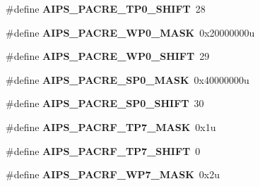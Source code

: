 \begin{DoxyCompactItemize}
\item 
\#define {\bfseries A\+I\+P\+S\+\_\+\+P\+A\+C\+R\+E\+\_\+\+T\+P0\+\_\+\+S\+H\+I\+FT}~28\hypertarget{group__AIPS__Register__Masks_ga33e43ff102c16587af4a1b319ba31787}{}\label{group__AIPS__Register__Masks_ga33e43ff102c16587af4a1b319ba31787}

\item 
\#define {\bfseries A\+I\+P\+S\+\_\+\+P\+A\+C\+R\+E\+\_\+\+W\+P0\+\_\+\+M\+A\+SK}~0x20000000u\hypertarget{group__AIPS__Register__Masks_ga748d7f597abbdc063d8d089bfac5264b}{}\label{group__AIPS__Register__Masks_ga748d7f597abbdc063d8d089bfac5264b}

\item 
\#define {\bfseries A\+I\+P\+S\+\_\+\+P\+A\+C\+R\+E\+\_\+\+W\+P0\+\_\+\+S\+H\+I\+FT}~29\hypertarget{group__AIPS__Register__Masks_gadbb6183241cf5602dd8e8cd87f5e970d}{}\label{group__AIPS__Register__Masks_gadbb6183241cf5602dd8e8cd87f5e970d}

\item 
\#define {\bfseries A\+I\+P\+S\+\_\+\+P\+A\+C\+R\+E\+\_\+\+S\+P0\+\_\+\+M\+A\+SK}~0x40000000u\hypertarget{group__AIPS__Register__Masks_gad466232930d5e4ed228f96fc26ead8c2}{}\label{group__AIPS__Register__Masks_gad466232930d5e4ed228f96fc26ead8c2}

\item 
\#define {\bfseries A\+I\+P\+S\+\_\+\+P\+A\+C\+R\+E\+\_\+\+S\+P0\+\_\+\+S\+H\+I\+FT}~30\hypertarget{group__AIPS__Register__Masks_ga47620f45a33c83729ba42d5cb7a96cd3}{}\label{group__AIPS__Register__Masks_ga47620f45a33c83729ba42d5cb7a96cd3}

\item 
\#define {\bfseries A\+I\+P\+S\+\_\+\+P\+A\+C\+R\+F\+\_\+\+T\+P7\+\_\+\+M\+A\+SK}~0x1u\hypertarget{group__AIPS__Register__Masks_ga9e5031cf93ccc20f6c807c7779884558}{}\label{group__AIPS__Register__Masks_ga9e5031cf93ccc20f6c807c7779884558}

\item 
\#define {\bfseries A\+I\+P\+S\+\_\+\+P\+A\+C\+R\+F\+\_\+\+T\+P7\+\_\+\+S\+H\+I\+FT}~0\hypertarget{group__AIPS__Register__Masks_gaf22d62e3a6d2920c5da05ba192828996}{}\label{group__AIPS__Register__Masks_gaf22d62e3a6d2920c5da05ba192828996}

\item 
\#define {\bfseries A\+I\+P\+S\+\_\+\+P\+A\+C\+R\+F\+\_\+\+W\+P7\+\_\+\+M\+A\+SK}~0x2u\hypertarget{group__AIPS__Register__Masks_ga6e87c0a628a47aed3cb92a0f589b291c}{}\label{group__AIPS__Register__Masks_ga6e87c0a628a47aed3cb92a0f589b291c}


\end{DoxyCompactItemize}
